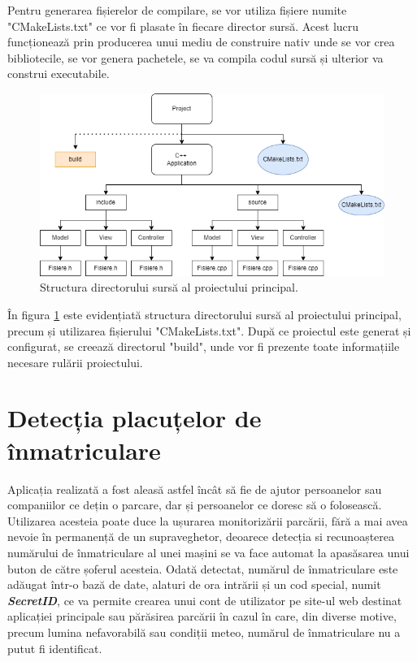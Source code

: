 \documentclass[12pt]{article}
\begin{document}
Pentru generarea fișierelor de compilare, se vor utiliza fișiere numite "CMakeLists.txt" ce vor fi plasate \^{i}n fiecare director surs\u{a}. Acest lucru funcționeaz\u{a} prin producerea unui mediu de construire nativ unde se vor crea bibliotecile, se vor genera pachetele, se va compila codul surs\u{a} și ulterior va construi executabile.

\begin{figure}[H]
  \centering
  \includegraphics[width=0.8\linewidth]{structura_cmake.png}
  \caption{Structura directorului surs\u{a} al proiectului principal.}
  \label{fig:structura_cmake}
\end{figure}


\^{I}n figura \ref{fig:structura_cmake} este evidențiat\u{a} structura directorului surs\u{a} al proiectului principal, precum și utilizarea fișierului "CMakeLists.txt". Dup\u{a} ce proiectul este generat și configurat, se creeaz\u{a} directorul "build", unde vor fi prezente toate informațiile necesare rul\u{a}rii proiectului.

\newpage

\section{Detecția placuțelor de \^{i}nmatriculare}

Aplicația realizat\u{a} a fost aleas\u{a} astfel \^{i}nc\^{a}t s\u{a} fie de ajutor persoanelor sau companiilor ce dețin o parcare, dar și persoanelor ce doresc s\u{a} o foloseasc\u{a}. Utilizarea acesteia poate duce la ușurarea monitoriz\u{a}rii parc\u{a}rii, f\u{a}r\u{a} a mai avea nevoie \^{i}n permanenț\u{a} de un supraveghetor, deoarece detecția si recunoașterea num\u{a}rului de \^{i}nmatriculare al unei mașini se va face automat la apas\u{a}sarea unui buton de c\u{a}tre șoferul acesteia. Odat\u{a} detectat, num\u{a}rul de \^{i}nmatriculare este ad\u{a}ugat \^{i}ntr-o baz\u{a} de date, alaturi de ora intr\u{a}rii și un cod special, numit \textbf{\textit{SecretID}}, ce va permite crearea unui cont de utilizator pe site-ul web destinat aplicației principale sau p\u{a}r\u{a}sirea parc\u{a}rii \^{i}n cazul \^{i}n care, din diverse motive, precum lumina nefavorabil\u{a} sau condiții meteo, num\u{a}rul de \^{i}nmatriculare nu a putut fi identificat. 
\end{document}
